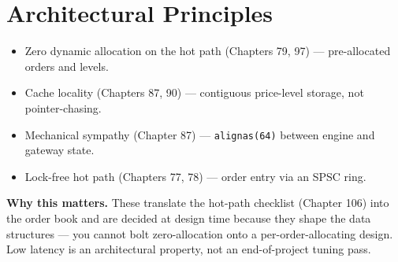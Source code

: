 \section{Architectural Principles}
\begin{itemize}
\item Zero dynamic allocation on the hot path (Chapters 79, 97) --- pre-allocated orders and levels.
\item Cache locality (Chapters 87, 90) --- contiguous price-level storage, not pointer-chasing.
\item Mechanical sympathy (Chapter 87) --- \texttt{alignas(64)} between engine and gateway state.
\item Lock-free hot path (Chapters 77, 78) --- order entry via an SPSC ring.
\end{itemize}

\textbf{Why this matters.} These translate the hot-path checklist (Chapter 106) into the order book and are decided at design time because they shape the data structures --- you cannot bolt zero-allocation onto a per-order-allocating design. Low latency is an architectural property, not an end-of-project tuning pass.

